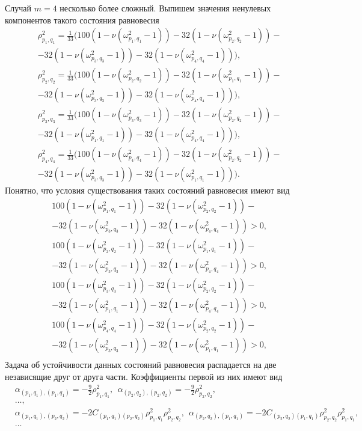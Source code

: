 \documentclass[12pt]{article}  %
\begin{document}
Случай $m=4$ несколько более сложный. Выпишем значения ненулевых компонентов такого состояния равновесия
\begin{equation}
\begin{split}
&\rho^2_{p_1,q_1}=\frac{1}{33}(100(1-\nu(\omega^2_{p_1,q_1}-1))-32(1-\nu(\omega^2_{p_2,q_2}-1))-\\
&-32(1-\nu(\omega^2_{p_3,q_3}-1))-32(1-\nu(\omega^2_{p_4,q_4}-1))),\\
&\rho^2_{p_2,q_2}=\frac{1}{33}(100(1-\nu(\omega^2_{p_2,q_2}-1))-32(1-\nu(\omega^2_{p_1,q_1}-1))-\\
&-32(1-\nu(\omega^2_{p_3,q_3}-1))-32(1-\nu(\omega^2_{p_4,q_4}-1))),\\
&\rho^2_{p_3,q_3}=\frac{1}{33}(100(1-\nu(\omega^2_{p_3,q_3}-1))-32(1-\nu(\omega^2_{p_2,q_2}-1))-\\
&-32(1-\nu(\omega^2_{p_1,q_1}-1))-32(1-\nu(\omega^2_{p_4,q_4}-1))),\\
&\rho^2_{p_4,q_4}=\frac{1}{33}(100(1-\nu(\omega^2_{p_4,q_4}-1))-32(1-\nu(\omega^2_{p_2,q_2}-1))-\\
&-32(1-\nu(\omega^2_{p_3,q_3}-1))-32(1-\nu(\omega^2_{p_1,q_1}-1))).
\end{split}
\end{equation}
Понятно, что условия существования таких состояний равновесия имеют вид
\begin{equation}
\begin{split}
&100(1-\nu(\omega^2_{p_1,q_1}-1))-32(1-\nu(\omega^2_{p_2,q_2}-1))-\\
&-32(1-\nu(\omega^2_{p_3,q_3}-1))-32(1-\nu(\omega^2_{p_4,q_4}-1)) > 0, \\
&100(1-\nu(\omega^2_{p_2,q_2}-1))-32(1-\nu(\omega^2_{p_1,q_1}-1))-\\
&-32(1-\nu(\omega^2_{p_3,q_3}-1))-32(1-\nu(\omega^2_{p_4,q_4}-1)) > 0, \\
&100(1-\nu(\omega^2_{p_3,q_3}-1))-32(1-\nu(\omega^2_{p_2,q_2}-1))-\\
&-32(1-\nu(\omega^2_{p_1,q_1}-1))-32(1-\nu(\omega^2_{p_4,q_4}-1)) > 0, \\
&100(1-\nu(\omega^2_{p_4,q_4}-1))-32(1-\nu(\omega^2_{p_2,q_2}-1))-\\
&-32(1-\nu(\omega^2_{p_3,q_3}-1))-32(1-\nu(\omega^2_{p_1,q_1}-1)) > 0, \\
\end{split}
\end{equation}
Задача об устойчивости данных состояний равновесия распадается на две независящие друг от друга части. Коэффициенты первой из них имеют вид
\begin{equation}
\begin{split}
&\alpha_{(p_1,q_1),(p_1,q_1)} = -\frac{9}{2}\rho^2_{p_1,q_1}, \ \ \alpha_{(p_2,q_2),(p_2,q_2)} = -\frac{9}{2}\rho^2_{p_2,q_2},\\
&\dots,\\
&\alpha_{(p_1,q_1),(p_2,q_2)} = - 2C_{(p_1,q_1)(p_2,q_2)}\rho^2_{p_1,q_1}\rho^2_{p_2,q_2}, \ \ \alpha_{(p_2,q_2),(p_1,q_1)} = - 2C_{(p_2,q_2)(p_1,q_1)}\rho^2_{p_2,q_2}\rho^2_{p_1,q_1},\\
&\dots
\end{split}
\end{equation}
\end{document}
